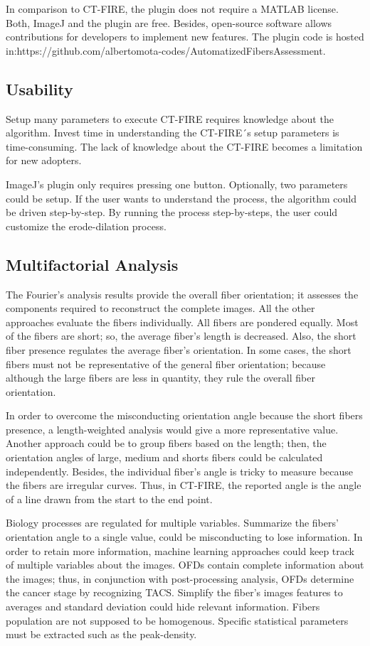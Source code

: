 \documentclass[12pt,a4paper]{article}
\begin{document}
In comparison to CT-FIRE, the plugin does not require a MATLAB license. Both, ImageJ and the plugin are free. Besides, open-source software allows contributions for developers to implement new features. The plugin code is hosted in:https://github.com/albertomota-codes/AutomatizedFibersAssessment.
\subsection{Usability}
Setup many parameters to execute CT-FIRE requires knowledge about the algorithm. Invest time in understanding the CT-FIRE´s setup parameters is time-consuming. The lack of knowledge about the CT-FIRE becomes a limitation for new adopters. 

ImageJ's plugin only requires pressing one button. Optionally, two parameters could be setup. If the user wants to understand the process, the algorithm could be driven step-by-step. By running the process step-by-steps, the user could customize the erode-dilation process.
\subsection{Multifactorial Analysis}

The Fourier's analysis results provide the overall fiber orientation; it assesses the components required to reconstruct the complete images. All the other approaches evaluate the fibers individually. All fibers are pondered equally. Most of the fibers are short; so, the average fiber's length is decreased. Also, the short fiber presence regulates the average fiber's orientation. In some cases, the short fibers must not be representative of the general fiber orientation; because although the large fibers are less in quantity, they rule the overall fiber orientation.

In order to overcome the misconducting orientation angle because the short fibers presence, a length-weighted analysis would give a more representative value. Another approach could be to group fibers based on the length; then, the orientation angles of large, medium and shorts fibers could be calculated independently. Besides, the individual fiber's angle is tricky to measure because the fibers are irregular curves. Thus, in CT-FIRE, the reported angle is the angle of a line drawn from the start to the end point.
 
Biology processes are regulated for multiple variables. Summarize the fibers' orientation angle to a single value, could be misconducting to lose information. In order to retain more information, machine learning approaches could keep track of multiple variables about the images. OFDs contain complete information about the images; thus, in conjunction with post-processing analysis, OFDs determine the cancer stage by recognizing TACS. Simplify the fiber's images features to averages and standard deviation could hide relevant information. Fibers population are not supposed to be homogenous. Specific statistical parameters must be extracted such as the peak-density. 
\end{document}
